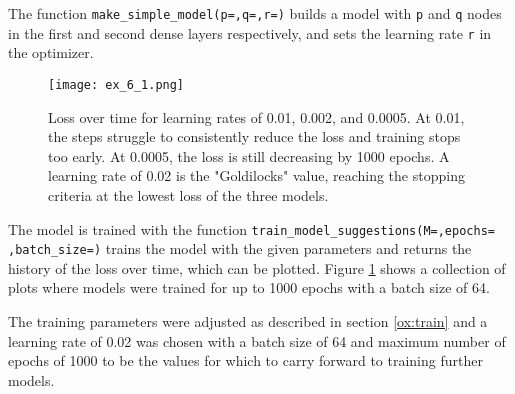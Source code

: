 \documentclass{somasmsc}
\begin{document}
\begin{exa}
The function \verb|make_simple_model(p=,q=,r=)| builds a model with \verb|p| and \verb|q| nodes in the first and second dense layers respectively, and sets the learning rate \verb|r| in the optimizer.

\begin{figure}[H]\label{ox:ex_6_1}
\begin{center}
\texttt{[image: ex\_6\_1.png]}
\end{center}
\caption{Loss over time for learning rates of 0.01, 0.002, and 0.0005. At 0.01, the steps struggle to consistently reduce the loss and training stops too early. At 0.0005, the loss is still decreasing by 1000 epochs. A learning rate of 0.02 is the "Goldilocks" value, reaching the stopping criteria at the lowest loss of the three models.}
\end{figure}

The model is trained with the function \verb|train_model_suggestions(M=,epochs=|
\verb|,batch_size=)| trains the model with the given parameters and returns the history of the loss over time, which can be plotted. Figure \ref{ox:ex_6_1} shows a collection of plots where models were trained for up to 1000 epochs with a batch size of 64.

The training parameters were adjusted as described in section \ref{ox:train} and a learning rate of 0.02 was chosen with a batch size of 64 and maximum number of epochs of 1000 to be the values for which to carry forward to training further models.
\end{exa}
\end{document}
